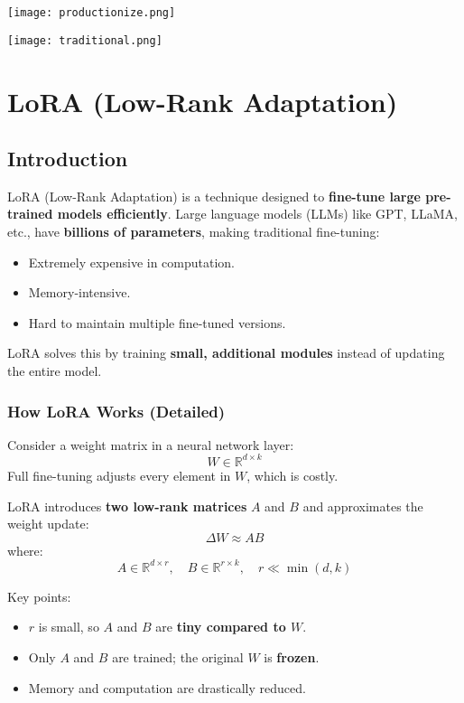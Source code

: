\begin{center}
\texttt{[image: productionize.png]}
\end{center}
\begin{center}
\texttt{[image: traditional.png]}
\end{center}

\newpage
\section{LoRA (Low-Rank Adaptation)}

\subsection{Introduction}
LoRA (Low-Rank Adaptation) is a technique designed to \textbf{fine-tune large pre-trained models efficiently}. Large language models (LLMs) like GPT, LLaMA, etc., have \textbf{billions of parameters}, making traditional fine-tuning:

\begin{itemize}
    \item Extremely expensive in computation.
    \item Memory-intensive.
    \item Hard to maintain multiple fine-tuned versions.
\end{itemize}

LoRA solves this by training \textbf{small, additional modules} instead of updating the entire model.

\subsubsection{How LoRA Works (Detailed)}
Consider a weight matrix in a neural network layer:  
\[
W \in \mathbb{R}^{d \times k}
\]
Full fine-tuning adjusts every element in $W$, which is costly.  

LoRA introduces \textbf{two low-rank matrices} $A$ and $B$ and approximates the weight update:
\[
\Delta W \approx A B
\]
where:
\[
A \in \mathbb{R}^{d \times r}, \quad B \in \mathbb{R}^{r \times k}, \quad r \ll \min(d, k)
\]

Key points:  
\begin{itemize}
    \item $r$ is small, so $A$ and $B$ are \textbf{tiny compared to $W$}.
    \item Only $A$ and $B$ are trained; the original $W$ is \textbf{frozen}.
    \item Memory and computation are drastically reduced.
\end{itemize}

